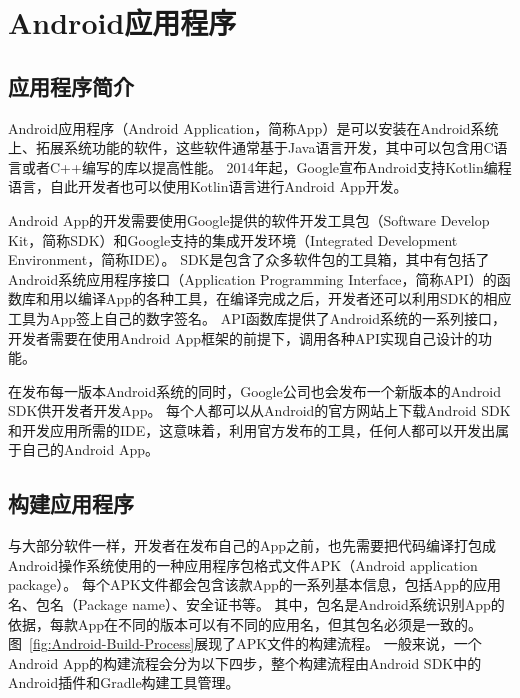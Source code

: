 \section{Android应用程序}

\subsection{应用程序简介}

Android应用程序（Android Application，简称App）是可以安装在Android系统上、拓展系统功能的软件，这些软件通常基于Java语言开发，其中可以包含用C语言或者C++编写的库以提高性能。
2014年起，Google宣布Android支持Kotlin编程语言，自此开发者也可以使用Kotlin语言进行Android App开发。

Android App的开发需要使用Google提供的软件开发工具包（Software Develop Kit，简称SDK）和Google支持的集成开发环境（Integrated Development Environment，简称IDE）。
SDK是包含了众多软件包的工具箱，其中有包括了Android系统应用程序接口（Application Programming Interface，简称API）的函数库和用以编译App的各种工具，在编译完成之后，开发者还可以利用SDK的相应工具为App签上自己的数字签名。
API函数库提供了Android系统的一系列接口，开发者需要在使用Android App框架的前提下，调用各种API实现自己设计的功能。

在发布每一版本Android系统的同时，Google公司也会发布一个新版本的Android SDK供开发者开发App。
每个人都可以从Android的官方网站上下载Android SDK和开发应用所需的IDE，这意味着，利用官方发布的工具，任何人都可以开发出属于自己的Android App。

\subsection{构建应用程序}

与大部分软件一样，开发者在发布自己的App之前，也先需要把代码编译打包成Android操作系统使用的一种应用程序包格式文件APK（Android application package）。
每个APK文件都会包含该款App的一系列基本信息，包括App的应用名、包名（Package name）、安全证书等。
其中，包名是Android系统识别App的依据，每款App在不同的版本可以有不同的应用名，但其包名必须是一致的。
图~\ref{fig:Android-Build-Process}展现了APK文件的构建流程。
一般来说，一个Android App的构建流程会分为以下四步，整个构建流程由Android SDK中的Android插件和Gradle构建工具管理。

